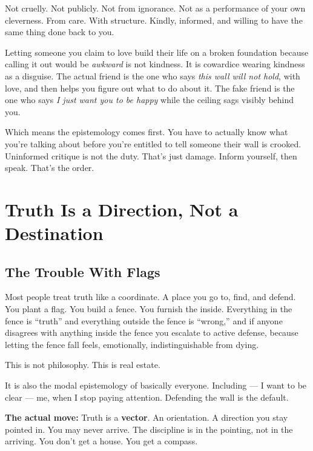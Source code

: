 \documentclass[11pt, letterpaper]{article}
\newcommand{\vocab}[1]{\textbf{\textcolor{meatred}{#1}}}
\begin{document}
Not cruelly. Not publicly. Not from ignorance. Not as a performance of your own cleverness. From care. With structure. Kindly, informed, and willing to have the same thing done back to you.

Letting someone you claim to love build their life on a broken foundation because calling it out would be \textit{awkward} is not kindness. It is cowardice wearing kindness as a disguise. The actual friend is the one who says \textit{this wall will not hold}, with love, and then helps you figure out what to do about it. The fake friend is the one who says \textit{I just want you to be happy} while the ceiling sags visibly behind you.

Which means the epistemology comes first. You have to actually know what you're talking about before you're entitled to tell someone their wall is crooked. Uninformed critique is not the duty. That's just damage. Inform yourself, then speak. That's the order.

\section{Truth Is a Direction, Not a Destination}

\subsection{The Trouble With Flags}

Most people treat truth like a coordinate. A place you go to, find, and defend. You plant a flag. You build a fence. You furnish the inside. Everything in the fence is ``truth'' and everything outside the fence is ``wrong,'' and if anyone disagrees with anything inside the fence you escalate to active defense, because letting the fence fall feels, emotionally, indistinguishable from dying.

This is not philosophy. This is real estate.

It is also the modal epistemology of basically everyone. Including --- I want to be clear --- me, when I stop paying attention. Defending the wall is the default.

\begin{notebox}
\textbf{The actual move:} Truth is a \vocab{vector}. An orientation. A direction you stay pointed in. You may never arrive. The discipline is in the pointing, not in the arriving. You don't get a house. You get a compass.
\end{notebox}
\end{document}
